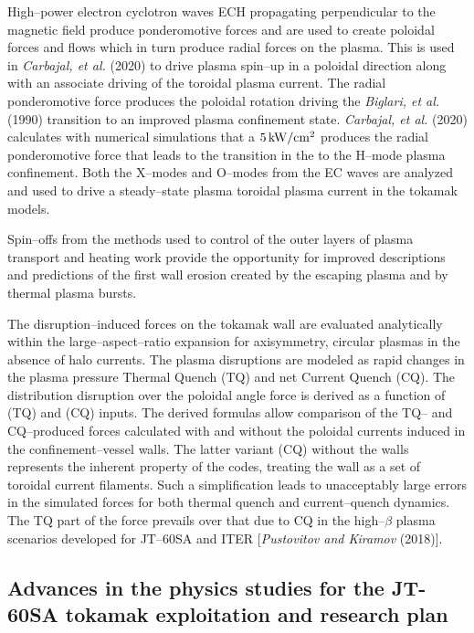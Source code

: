 \documentclass[a4paper,openany,12pt]{book}
\begin{document}
High--power electron cyclotron waves ECH propagating perpendicular to the magnetic field produce ponderomotive forces and are used to create poloidal forces and flows which in turn produce radial forces on the plasma. This is used in \emph{Carbajal, et al.} (2020) to drive plasma spin--up in a poloidal direction along with an associate driving of the toroidal plasma current. The radial ponderomotive force produces the poloidal rotation driving the \emph{Biglari, et al.} (1990) transition to an improved plasma confinement state. \emph{Carbajal, et al.} (2020) calculates with numerical simulations that a $5\,\rm kW/cm^2$ produces the radial ponderomotive force that leads to the transition in the to the H--mode plasma confinement. Both the X--modes and O--modes from the EC waves are analyzed and used to drive a steady--state plasma toroidal plasma current in the tokamak models.

Spin--offs from the methods used to control of the outer layers of plasma transport and heating work provide the opportunity for improved descriptions and predictions of the first wall erosion created by the escaping plasma and by thermal plasma bursts.

The disruption--induced forces on the tokamak wall are evaluated analytically within the large--aspect--ratio expansion for axisymmetry, circular plasmas in the absence of halo currents. The plasma disruptions are modeled as rapid changes in the plasma pressure Thermal Quench (TQ) and net Current Quench (CQ). The distribution disruption over the poloidal angle force is derived as a function of (TQ) and (CQ) inputs. The derived formulas allow comparison of the TQ-- and CQ--produced forces calculated with and without the poloidal currents induced in the confinement--vessel walls. The latter variant (CQ) without the walls represents the inherent property of the codes, treating the wall as a set of toroidal current filaments. Such a simplification leads to unacceptably large errors in the simulated forces for both thermal quench and current--quench dynamics. The TQ part of the force prevails over that due to CQ in the high--$\beta$ plasma scenarios developed for JT--60SA and ITER [\emph{Pustovitov and Kiramov} (2018)].

\subsection{Advances in the physics studies for the JT-60SA tokamak exploitation and research plan}
\end{document}
